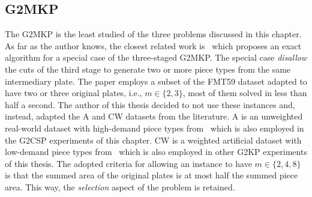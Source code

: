 \subsection{G2MKP}

The G2MKP is the least studied of the three problems discussed in this chapter.
As far as the author knows, the closest related work is~\citet{cui:2008} which proposes an exact algorithm for a special case of the three-staged G2MKP.
The special case \emph{disallow} the cuts of the third stage to generate two or more piece types from the same intermediary plate.
The paper employs a subset of the FMT59 dataset adapted to have two or three original plates, i.e., \(m \in \{2, 3\}\), most of them solved in less than half a second.
The author of this thesis decided to not use these instances and, instead, adapted the A and CW datasets from the literature.
A is an unweighted real-world dataset with high-demand piece types from~\citet{macedo:2010} which is also employed in the G2CSP experiments of this chapter.
CW is a weighted artificial dataset with low-demand piece types from~\citet{fayard:1998} which is also employed in other G2KP experiments of this thesis.
The adopted criteria for allowing an instance to have \(m \in \{2, 4, 8\}\) is that the summed area of the original plates is at most half the summed piece area.
This way, the \emph{selection} aspect of the problem is retained.

